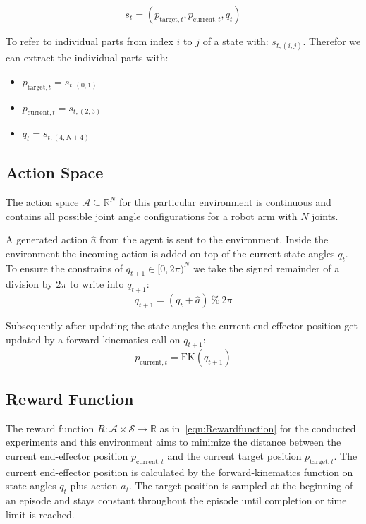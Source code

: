 \begin{equation}\label{eqn:state}
    s_t = (p_{\text{target}, t}, p_{\text{current}, t}, q_t)
\end{equation}

To refer to individual parts from index $i$ to $j$ of a state with: $s_{t, (i, j)}$. Therefor we can extract the individual parts with:
\begin{itemize}
    \item $p_{\text{target}, t} = s_{t, (0, 1)}$ 
    \item $p_{\text{current}, t} = s_{t, (2, 3)}$
    \item $q_{t} = s_{t, (4, N + 4)}$
\end{itemize}

\subsection{Action Space}

The action space $\mathcal{A} \subseteq \mathbb{R}^N$ for this particular environment is continuous and contains all possible joint angle configurations for a robot arm with $N$ joints. 

A generated action $\hat{a}$ from the agent is sent to the environment. Inside the environment the incoming action is added on top of the current state angles $q_t$. To ensure the constrains of $q_{t+1} \in [0, 2\pi)^N$ we take the signed remainder of a division by $2\pi$ to write into $q_{t+1}$:
\begin{equation*}
    q_{t+1} = (q_t + \hat{a}) \ \% \ 2\pi
\end{equation*}

Subsequently after updating the state angles the current end-effector position get updated by a forward kinematics call on $q_{t+1}$:
\begin{equation*}
    p_{\text{current}, t} = \text{FK}(q_{t+1})
\end{equation*}


\subsection{Reward Function}

The reward function $R: \mathcal{A} \times \mathcal{S} \to \mathbb{R}$ as in~\eqref{eqn:Rewardfunction} for the conducted experiments and this environment aims to minimize the distance between the current end-effector position $p_{\text{current}, t}$ and the current target position $p_{\text{target}, t}$. The current end-effector position is calculated by the forward-kinematics function on state-angles $q_t$ plus action $a_t$. The target position is sampled at the beginning of an episode and stays constant throughout the episode until completion or time limit is reached. 

